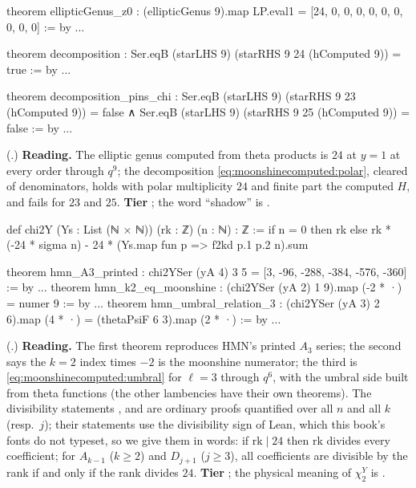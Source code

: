 \begin{leanbox}
\begin{leancode}
theorem ellipticGenus_z0 :
    (ellipticGenus 9).map LP.eval1 = [24, 0, 0, 0, 0, 0, 0, 0, 0, 0] := by ...

theorem decomposition : Ser.eqB (starLHS 9) (starRHS 9 24 (hComputed 9)) = true := by ...

theorem decomposition_pins_chi :
    Ser.eqB (starLHS 9) (starRHS 9 23 (hComputed 9)) = false ∧
      Ser.eqB (starLHS 9) (starRHS 9 25 (hComputed 9)) = false := by ...
\end{leancode}
(.) \textbf{Reading.} The elliptic genus computed from
theta products is $24$ at $y=1$ at every order through $q^9$; the decomposition
\eqref{eq:moonshinecomputed:polar}, cleared of denominators, holds with polar multiplicity
$24$ and finite part the computed $H$, and fails for $23$ and $25$. \textbf{Tier} \TA; the
word ``shadow'' is \TL.
\end{leanbox}

\begin{leanbox}
\begin{leancode}
def chi2Y (Ys : List (ℕ × ℕ)) (rk : ℤ) (n : ℕ) : ℤ :=
  if n = 0 then rk else rk * (-24 * sigma n) - 24 * (Ys.map fun p => f2kd p.1 p.2 n).sum

theorem hmn_A3_printed : chi2YSer (yA 4) 3 5 = [3, -96, -288, -384, -576, -360] := by ...
theorem hmn_k2_eq_moonshine : (chi2YSer (yA 2) 1 9).map (-2 * ·) = numer 9 := by ...
theorem hmn_umbral_relation_3 :
    (chi2YSer (yA 3) 2 6).map (4 * ·) = (thetaPsiF 6 3).map (2 * ·) := by ...
\end{leancode}
(.) \textbf{Reading.} The first theorem reproduces
HMN's printed $A_3$ series; the second says the $k=2$ index times $-2$ is the moonshine
numerator; the third is \eqref{eq:moonshinecomputed:umbral} for $\ell=3$ through $q^6$, with
the umbral side built from theta functions (the other lambencies have their own theorems).
The divisibility statements ,  and
 are ordinary proofs quantified over all $n$ and all $k$ (resp.\
$j$); their statements use the divisibility sign of Lean, which this book's fonts do not
typeset, so we give them in words: if $\mathrm{rk}\mid24$ then $\mathrm{rk}$ divides every
coefficient; for $A_{k-1}$ ($k\ge2$) and $D_{j+1}$ ($j\ge3$), all coefficients are divisible
by the rank if and only if the rank divides $24$. \textbf{Tier} \TA; the physical meaning
of $\chi_2^Y$ is \TL.
\end{leanbox}

